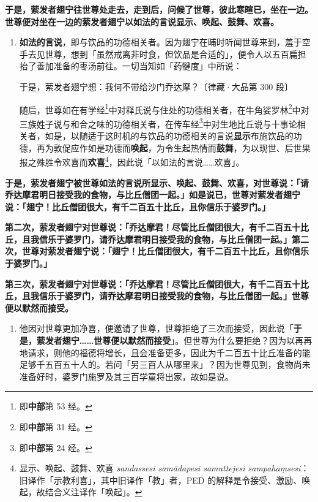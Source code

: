 \textbf{于是，萦发者翅宁往世尊处走去，走到后，问候了世尊，彼此寒暄已，坐在一边。世尊便对坐在一边的萦发者翅宁以如法的言说显示、唤起、鼓舞、欢喜。}

\begin{enumerate}\item \textbf{如法的言说}，即与饮品的功德相关者。因为翅宁在晡时听闻世尊来到，羞于空手去见世尊，想到「虽然戒离非时食，但饮品是合适的」，便令人以五百扁担抬了善加准备的枣汤前往。一切当知如「药犍度」中所说：\begin{quoting}于是，萦发者翅宁想：我何不带给沙门乔达摩？{\bluefootnotesize 〔律藏·大品第 300 段〕}\end{quoting}随后，世尊如在有学经\footnote{即\textbf{中部}第 53 经。}中对释氏说与住处的功德相关者，在牛角娑罗林\footnote{即\textbf{中部}第 31 经。}中对三族姓子说与和合之味的功德相关者，在传车经\footnote{即\textbf{中部}第 24 经。}中对生地比丘说与十事论相关者，如是，以随适于这时机的与饮品的功德相关的言说\textbf{显示}布施饮品的功德，再为敦促应作如是功德而\textbf{唤起}，为令生起热情而\textbf{鼓舞}，为以现世、后世果报之殊胜令欢喜而\textbf{欢喜}\footnote{显示、唤起、鼓舞、欢喜 \textit{sandassesi samādapesi samuttejesi sampahaṃsesi}：旧译作「示教利喜」，其中旧译作「教」者，PED 的解释是令接受、激励、唤起，故结合义注译作「唤起」。}，因此说「以如法的言说……欢喜」。\end{enumerate}

\textbf{于是，萦发者翅宁被世尊如法的言说所显示、唤起、鼓舞、欢喜，对世尊说：「请乔达摩君明日接受我的食物，与比丘僧团一起。」如是说已，世尊对萦发者翅宁说：「翅宁！比丘僧团很大，有千二百五十比丘，且你信乐于婆罗门。」}

\textbf{第二次，萦发者翅宁对世尊说：「乔达摩君！尽管比丘僧团很大，有千二百五十比丘，且我信乐于婆罗门，请乔达摩君明日接受我的食物，与比丘僧团一起。」第二次，世尊对萦发者翅宁说：「翅宁！比丘僧团很大，有千二百五十比丘，且你信乐于婆罗门。」}

\textbf{第三次，萦发者翅宁对世尊说：「乔达摩君！尽管比丘僧团很大，有千二百五十比丘，且我信乐于婆罗门，请乔达摩君明日接受我的食物，与比丘僧团一起。」世尊便以默然而接受。}

\begin{enumerate}\item 他因对世尊更加净喜，便邀请了世尊，世尊拒绝了三次而接受，因此说「\textbf{于是，萦发者翅宁……世尊便以默然而接受}」。但世尊为什么要拒绝？因为以再再地请求，则他的福德将增长，且会准备更多，因此为千二百五十比丘准备的能足够千五百五十人的。若问「另三百人从哪里来」？因为世尊见到，食物尚未准备好时，婆罗门施罗及其三百学童将出家，故如是说。\end{enumerate}

